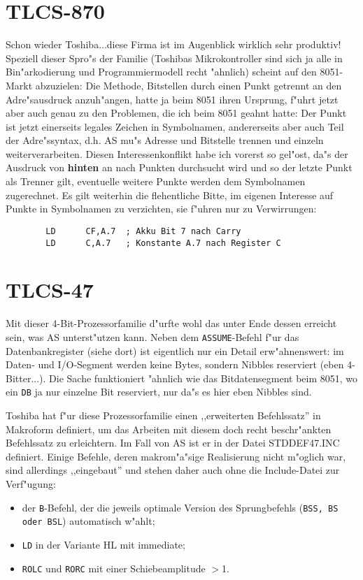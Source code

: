 \documentclass[12pt,a4paper,twoside]{report}
\newcommand{\bb}[1]{{\bf #1}}
\newcommand{\tty}[1]{{\tt #1}}
\begin{document}
{%

\section{TLCS-870}

Schon wieder Toshiba...diese Firma ist im Augenblick wirklich sehr
produktiv!  Speziell dieser Spro"s der Familie (Toshibas Mikrokontroller
sind sich ja alle in Bin"arkodierung und Programmiermodell recht "ahnlich)
scheint auf den 8051-Markt abzuzielen: Die Methode, Bitstellen durch einen
Punkt getrennt an den Adre"sausdruck anzuh"angen, hatte ja beim 8051 ihren
Ursprung, f"uhrt jetzt aber auch genau zu den Problemen, die ich beim 8051
geahnt hatte: Der Punkt ist jetzt einerseits legales Zeichen in Symbolnamen,
andererseits aber auch Teil der Adre"ssyntax, d.h. AS mu"s Adresse und
Bitstelle trennen und einzeln weiterverarbeiten.  Diesen Interessenkonflikt
habe ich vorerst so gel"ost, da"s der Ausdruck von \bb{hinten} an nach
Punkten durchsucht wird und so der letzte Punkt als Trenner gilt, eventuelle
weitere Punkte werden dem Symbolnamen zugerechnet.  Es gilt weiterhin die
flehentliche Bitte, im eigenen Interesse auf Punkte in Symbolnamen zu
verzichten, sie f"uhren nur zu Verwirrungen:
\begin{verbatim}
        LD      CF,A.7  ; Akku Bit 7 nach Carry
        LD      C,A.7   ; Konstante A.7 nach Register C
\end{verbatim}


\section{TLCS-47}

Mit dieser 4-Bit-Prozessorfamilie d"urfte wohl das unter Ende dessen
erreicht sein, was AS unterst"utzen kann.  Neben dem \tty{ASSUME}-Befehl
f"ur das Datenbankregister (siehe dort) ist eigentlich nur ein Detail
erw"ahnenswert: im Daten- und I/O-Segment werden keine Bytes, sondern
Nibbles reserviert (eben 4-Bitter...).  Die Sache funktioniert "ahnlich
wie das Bitdatensegment beim 8051, wo ein \tty{DB} ja nur einzelne Bit
reserviert, nur da"s es hier eben Nibbles sind.
\par
Toshiba hat f"ur diese Prozessorfamilie einen ,,erweiterten Befehlssatz''
in Makroform definiert, um das Arbeiten mit diesem doch recht
beschr"ankten Befehlssatz zu erleichtern.  Im Fall von AS ist er in der
Datei STDDEF47.INC definiert.  Einige Befehle, deren makrom"a"sige
Realisierung nicht m"oglich war, sind allerdings ,,eingebaut'' und stehen
daher auch ohne die Include-Datei zur Verf"ugung:
\begin{itemize}
\item{der \tty{B}-Befehl, der die jeweils optimale Version des
      Sprungbefehls (\tty{BSS, BS oder BSL}) automatisch w"ahlt;}
\item{\tty{LD} in der Variante HL mit immediate;}
\item{\tty{ROLC} und \tty{RORC} mit einer Schiebeamplitude $>$1.}
\end{itemize}

}
\end{document}
